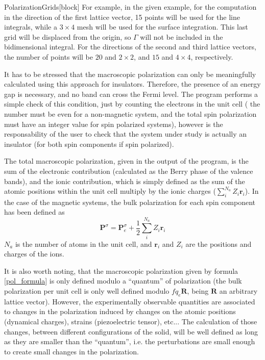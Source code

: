 \begin{fdfentry}{PolarizationGrids}[block]
    For example, in the given example, for the computation in the
    direction of the first lattice vector, 15 points will be used for
    the line integrals, while a $3\times4$ mesh will be used for the
    surface integration. This last grid will be displaced from the
    origin, so $\Gamma$ will not be included in the bidimensional
    integral. For the directions of the second and third lattice
    vectors, the number of points will be $20$ and $2\times2$, and $15$
    and $4\times4$, respectively.

    It has to be stressed that the macroscopic polarization can only be
    meaningfully calculated using this approach for insulators.
    Therefore, the presence of an energy gap is necessary, and no band
    can cross the Fermi level. The program performs a simple check of
    this condition, just by counting the electrons in the unit cell (
    the number must be even for a non-magnetic system, and the total
    spin polarization must have an integer value for spin polarized
    systems), however is the responsability of the user to check that
    the system under study is actually an insulator (for both spin
    components if spin polarized).

    The total macroscopic polarization, given in the output of the
    program, is the sum of the electronic contribution (calculated as
    the Berry phase of the valence bands), and the ionic contribution,
    which is simply defined as the sum of the atomic positions within
    the unit cell multiply by the ionic charges
    ($\sum_i^{N_a} Z_i \mathbf{r}_i$).  In the case of the magnetic
    systems, the bulk polarization for each spin component has been
    defined as
    \begin{equation}
      \mathbf{P}^\sigma = \mathbf{P}_e^\sigma +
      \frac12 \sum_i^{N_a}  Z_i \mathbf{r}_i
    \end{equation}
    $N_a$ is the number of atoms in the unit cell, and $\mathbf{r}_i$
    and $Z_i$ are the positions and charges of the ions.

    It is also worth noting, that the macroscopic polarization given by
    formula \eqref{pol_formula} is only defined modulo a ``quantum'' of
    polarization (the bulk polarization per unit cell is only well
    defined modulo $fq_e\mathbf{R}$, being $\mathbf{R}$ an arbitrary
    lattice vector). However, the experimentally observable quantities
    are associated to changes in the polarization induced by changes on
    the atomic positions (dynamical charges), strains (piezoelectric
    tensor), etc... The calculation of those changes, between different
    configurations of the solid, will be well defined as long as they
    are smaller than the ``quantum'', i.e. the perturbations are small
    enough to create small changes in the polarization.

  \end{fdfentry}

